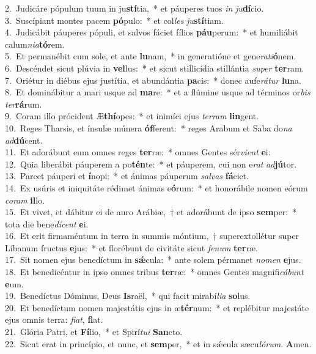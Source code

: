 {2.~}Judicáre pópulum tuum in ju\textbf{stí}tia,~* et páuperes tuos \textit{in} \textit{ju}\textbf{dí}cio.\\
{3.~}Suscípiant montes pacem \textbf{pó}pulo:~* et col\textit{les} \textit{ju}\textbf{stí}tiam.\\
{4.~}Judicábit páuperes pópuli, et salvos fáciet fílios \textbf{páu}perum:~* et humiliábit calum\textit{ni}\textit{a}\textbf{tó}rem.\\
{5.~}Et permanébit cum sole, et ante \textbf{lu}nam,~* in generatióne et gene\textit{ra}\textit{ti}\textbf{ó}nem.\\
{6.~}Descéndet sicut plúvia in \textbf{vel}lus:~* et sicut stillicídia stillántia \textit{su}\textit{per} \textbf{ter}ram.\\
{7.~}Oriétur in diébus ejus justítia, et abundántia \textbf{pa}cis:~* donec aufe\textit{rá}\textit{tur} \textbf{lu}na.\\
{8.~}Et dominábitur a mari usque ad \textbf{ma}re:~* et a flúmine usque ad términos or\textit{bis} \textit{ter}\textbf{rá}rum.\\
{9.~}Coram illo prócident Æ\textbf{thí}opes:~* et inimíci ejus \textit{ter}\textit{ram} \textbf{lin}gent.\\
{10.~}Reges Tharsis, et ínsulæ múnera \textbf{óf}ferent:~* reges Arabum et Saba do\textit{na} \textit{ad}\textbf{dú}cent.\\
{11.~}Et adorábunt eum omnes reges \textbf{ter}ræ:~* omnes Gentes sér\textit{vi}\textit{ent} \textbf{e}i:\\
{12.~}Quia liberábit páuperem a po\textbf{tén}te:~* et páuperem, cui non e\textit{rat} \textit{ad}\textbf{jú}tor.\\
{13.~}Parcet páuperi et \textbf{í}nopi:~* et ánimas páuperum \textit{sal}\textit{vas} \textbf{fá}ciet.\\
{14.~}Ex usúris et iniquitáte rédimet ánimas e\textbf{ó}rum:~* et honorábile nomen eórum \textit{co}\textit{ram} \textbf{il}lo.\\
{15.~}Et vivet, et dábitur ei de auro Arábiæ,~† et adorábunt de ipso \textbf{sem}per:~* tota die bene\textit{dí}\textit{cent} \textbf{e}i.\\
{16.~}Et erit firmaméntum in terra in summis móntium,~† superextollétur super Líbanum fructus \textbf{e}jus:~* et florébunt de civitáte sicut \textit{fe}\textit{num} \textbf{ter}ræ.\\
{17.~}Sit nomen ejus benedíctum in \textbf{sǽ}cula:~* ante solem pérmanet \textit{no}\textit{men} \textbf{e}jus.\\
{18.~}Et benedicéntur in ipso omnes tribus \textbf{ter}ræ:~* omnes Gentes magnifi\textit{cá}\textit{bunt} \textbf{e}um.\\
{19.~}Benedíctus Dóminus, Deus \textbf{Is}raël,~* qui facit mirabí\textit{li}\textit{a} \textbf{so}lus.\\
{20.~}Et benedíctum nomen majestátis ejus in æ\textbf{tér}num:~* et replébitur majestáte ejus omnis terra: \textit{fi}\textit{at}, \textbf{fi}at.\\
{21.~}Glória Patri, et \textbf{Fí}lio,~* et Spirí\textit{tu}\textit{i} \textbf{San}cto.\\
{22.~}Sicut erat in princípio, et nunc, et \textbf{sem}per,~* et in sǽcula sæcu\textit{ló}\textit{rum}. \textbf{A}men.\\
